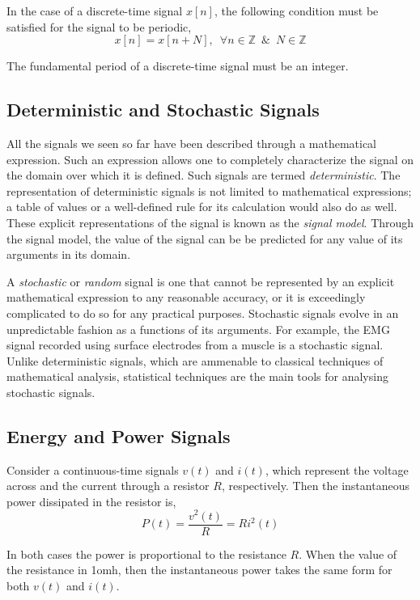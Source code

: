 In the case of a discrete-time signal $x\left[n\right]$, the following condition must be satisfied for the signal to be periodic,
\[ x\left[n\right] = x\left[n + N\right], \,\,\, \forall n \in \mathbb{Z} \,\,\, \& \,\,\, N \in \mathbb{Z} \]

The fundamental period of a discrete-time signal must be an integer.

\subsection{Deterministic and Stochastic Signals}
All the signals we seen so far have been described through a mathematical expression. Such an expression allows one to completely characterize the signal on the domain over which it is defined. Such signals are termed \textit{deterministic}. The representation of deterministic signals is not limited to mathematical expressions; a table of values or a well-defined rule for its calculation would also do as well. These explicit representations of the signal is known as the \textit{signal model}. Through the signal model, the value of the signal can be be predicted for any value of its arguments in its domain. 

A \textit{stochastic} or \textit{random} signal is one that cannot be represented by an explicit mathematical expression to any reasonable accuracy, or it is exceedingly complicated to do so for any practical purposes. Stochastic signals evolve in an unpredictable fashion as a functions of its arguments. For example, the EMG signal recorded using surface electrodes from a muscle is a stochastic signal. Unlike deterministic signals, which are ammenable to classical techniques of mathematical analysis, statistical techniques are the main tools for analysing stochastic signals.

\subsection{Energy and Power Signals}
Consider a continuous-time signals $v\left(t\right)$ and $i\left(t\right)$, which represent the voltage across and the current through a resistor $R$, respectively. Then the instantaneous power dissipated in the resistor is,
\[ P\left(t\right) = \frac{v^{2}\left(t\right)}{R} = Ri^{2}\left(t\right) \]

In both cases the power is proportional to the resistance $R$. When the value of the resistance in 1omh, then the instantaneous power takes the same form for both $v\left(t\right)$ and $i\left(t\right)$.

